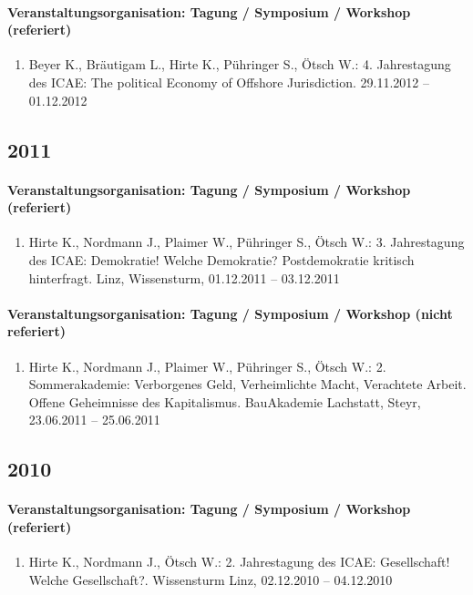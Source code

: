 \paragraph{Veranstaltungsorganisation: Tagung / Symposium / Workshop (referiert)}
\begin{enumerate}[leftmargin=*, labelsep=0.5cm]
\item Beyer K., Bräutigam L., Hirte K., Pühringer S., Ötsch W.: 4. Jahrestagung des ICAE: The political Economy of Offshore Jurisdiction. 29.11.2012 -- 01.12.2012
\end{enumerate}\subsection*{2011}\paragraph{Veranstaltungsorganisation: Tagung / Symposium / Workshop (referiert)}
\begin{enumerate}[leftmargin=*, labelsep=0.5cm]
\item Hirte K., Nordmann J., Plaimer W., Pühringer S., Ötsch W.: 3. Jahrestagung des ICAE: Demokratie! Welche Demokratie? Postdemokratie kritisch hinterfragt. Linz, Wissensturm, 01.12.2011 -- 03.12.2011
\end{enumerate}
\paragraph{Veranstaltungsorganisation: Tagung / Symposium / Workshop (nicht referiert)}
\begin{enumerate}[leftmargin=*, labelsep=0.5cm]
\item Hirte K., Nordmann J., Plaimer W., Pühringer S., Ötsch W.: 2. Sommerakademie: Verborgenes Geld, Verheimlichte Macht, Verachtete Arbeit. Offene Geheimnisse des Kapitalismus. BauAkademie Lachstatt, Steyr, 23.06.2011 -- 25.06.2011
\end{enumerate}\subsection*{2010}\paragraph{Veranstaltungsorganisation: Tagung / Symposium / Workshop (referiert)}
\begin{enumerate}[leftmargin=*, labelsep=0.5cm]
\item Hirte K., Nordmann J., Ötsch W.: 2. Jahrestagung des ICAE: Gesellschaft! Welche Gesellschaft?. Wissensturm Linz, 02.12.2010 -- 04.12.2010
\end{enumerate}
